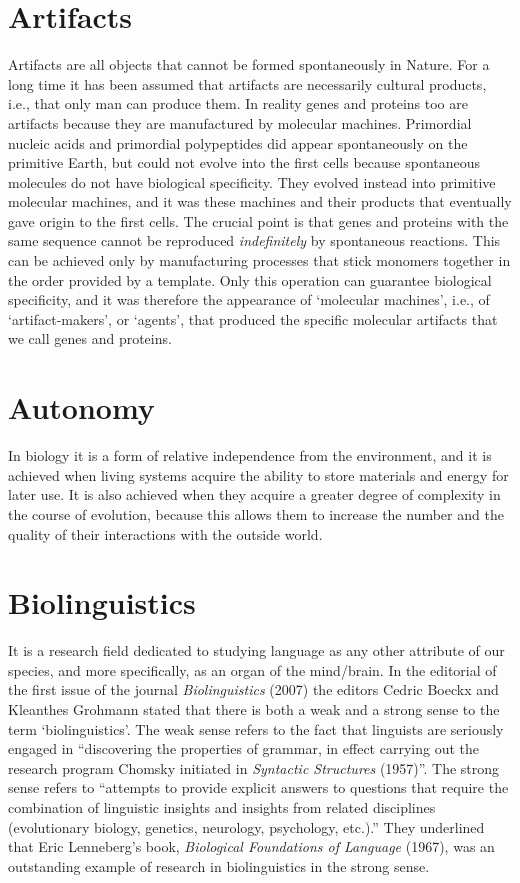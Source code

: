 \documentclass[12pt]{article}
\begin{document}
\section{Artifacts}
Artifacts are all objects that cannot be formed spontaneously in Nature. For a long time it has been assumed that artifacts are necessarily cultural products, i.e., that only man can produce them. In reality genes and proteins too are artifacts because they are manufactured by molecular machines. Primordial nucleic acids and primordial polypeptides did appear spontaneously on the primitive Earth, but could not evolve into the first cells because spontaneous molecules do not have biological specificity. They evolved instead into primitive molecular machines, and it was these machines and their products that eventually gave origin to the first cells. The crucial point is that genes and proteins with the same sequence cannot be reproduced \textit{indefinitely} by spontaneous reactions. This can be achieved only by manufacturing processes that stick monomers together in the order provided by a template. Only this operation can guarantee biological specificity, and it was therefore the appearance of `molecular machines', i.e., of `artifact-makers', or `agents', that produced the specific molecular artifacts that we call genes and proteins. 


\section{Autonomy}
In biology it is a form of relative independence from the environment, and it is achieved when living systems acquire the ability to store materials and energy for later use. It is also achieved when they acquire a greater degree of complexity in the course of evolution, because this allows them to increase the number and the quality of their interactions with the outside world. 


\section{Biolinguistics}
It is a research field dedicated to studying language as any other attribute of our species, and more specifically, as an organ of the mind/brain. In the editorial of the first issue of the journal \textit{Biolinguistics} (2007) the editors Cedric Boeckx and Kleanthes Grohmann stated that there is both a weak and a strong sense to the term `biolinguistics'. The weak sense refers to the fact that linguists are seriously engaged in ``discovering the properties of grammar, in effect carrying out the research program Chomsky initiated in \textit{Syntactic Structures} (1957)''. The strong sense refers to ``attempts to provide explicit answers to questions that require the combination of linguistic insights and insights from related disciplines (evolutionary biology, genetics, neurology, psychology, etc.).'' They underlined that Eric Lenneberg's book, \textit{Biological Foundations of Language} (1967), was an outstanding example of research in biolinguistics in the strong sense.
\end{document}
